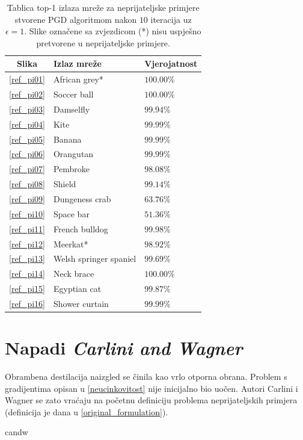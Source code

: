 \documentclass[utf8, diplomski]{fer}
\begin{document}
\begin{table}[H]
\centering
\begin{tabular}{@{}cll@{}}
\toprule
Slika & Izlaz mreže & Vjerojatnost \\ \midrule
\ref{ref_pi01} & African grey* & $100.00\%$\\
\ref{ref_pi02} & Soccer ball & $100.00\%$ \\ 
\ref{ref_pi03} & Damselfly & $99.94\%$ \\ 
\ref{ref_pi04} & Kite & $99.99\%$ \\  
\ref{ref_pi05} & Banana & $99.99\%$ \\ 
\ref{ref_pi06} & Orangutan & $99.99\%$ \\ 
\ref{ref_pi07} & Pembroke & $98.08\%$ \\ 
\ref{ref_pi08} & Shield & $99.14\%$ \\ 
\ref{ref_pi09} & Dungeness crab & $63.76\%$ \\ 
\ref{ref_pi10} & Space bar & $51.36\%$ \\ 
\ref{ref_pi11} & French bulldog & $99.98\%$ \\ 
\ref{ref_pi12} & Meerkat* & $98.92\%$ \\ 
\ref{ref_pi13} & Welsh springer spaniel & $99.69\%$ \\ 
\ref{ref_pi14} & Neck brace & $100.00\%$ \\ 
\ref{ref_pi15} & Egyptian cat & $99.87\%$ \\ 
\ref{ref_pi16} & Shower curtain & $99.99\%$ \\ \bottomrule
\end{tabular}
\caption{Tablica top-1 izlaza mreže za neprijateljske primjere stvorene PGD algoritmom nakon $10$ iteracija uz $\epsilon = 1$. Slike označene sa zvjezdicom (*) nisu uspješno pretvorene u neprijateljske primjere.}\label{pgd_predictions}
\end{table}

\section{Napadi \textit{Carlini and Wagner}}
Obrambena destilacija naizgled se činila kao vrlo otporna obrana. Problem s gradijentima opisan u \ref{neucinkovitost} nije inicijalno bio uočen. Autori Carlini i Wagner se zato vraćaju na početnu definiciju problema neprijateljskih primjera (definicija je dana u \ref{original_formulation}). 

 candw\citep{Carlini2017TowardsET}
\end{document}
